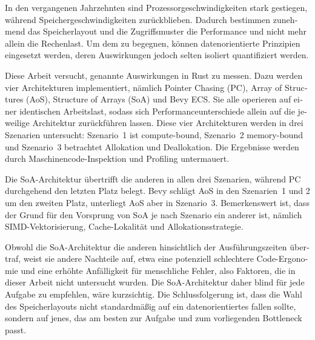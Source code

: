 \cleardoubleoddpage
\begin{otherlanguage}{ngerman}
\begin{abstract*}

In den vergangenen Jahrzehnten sind Prozessorgeschwindigkeiten stark gestiegen, während Speichergeschwindigkeiten zurückblieben. Dadurch bestimmen zunehmend das Speicherlayout und die Zugriffsmuster die Performance und nicht mehr allein die Rechenlast. Um dem zu begegnen, können datenorientierte Prinzipien eingesetzt werden, deren Auswirkungen jedoch selten isoliert quantifiziert werden. 

Diese Arbeit versucht, genannte Auswirkungen in Rust zu messen. Dazu werden vier Architekturen implementiert, nämlich Pointer Chasing (PC), Array of Structures (AoS), Structure of Arrays (SoA) und Bevy ECS. Sie alle operieren auf einer identischen Arbeitslast, sodass sich Performanceunterschiede allein auf die jeweilige Architektur zurückführen lassen. Diese vier Architekturen werden in drei Szenarien untersucht: Szenario~1 ist compute-bound, Szenario~2 memory-bound und Szenario~3 betrachtet Allokation und Deallokation. Die Ergebnisse werden durch Maschinencode-Inspektion und Profiling untermauert. 

Die SoA-Architektur übertrifft die anderen in allen drei Szenarien, während PC durchgehend den letzten Platz belegt. Bevy schlägt AoS in den Szenarien~1 und 2 um den zweiten Platz, unterliegt AoS aber in Szenario~3. Bemerkenswert ist, dass der Grund für den Vorsprung von SoA je nach Szenario ein anderer ist, nämlich SIMD-Vektorisierung, Cache-Lokalität und Allokationsstrategie. 

Obwohl die SoA-Architektur die anderen hinsichtlich der Ausführungszeiten übertraf, weist sie andere Nachteile auf, etwa eine potenziell schlechtere Code-Ergonomie und eine erhöhte Anfälligkeit für menschliche Fehler, also Faktoren, die in dieser Arbeit nicht untersucht wurden. Die SoA-Architektur daher blind für jede Aufgabe zu empfehlen, wäre kurzsichtig. Die Schlussfolgerung ist, dass die Wahl des Speicherlayouts nicht standardmäßig auf ein datenorientiertes fallen sollte, sondern auf jenes, das am besten zur Aufgabe und zum vorliegenden Bottleneck passt.

\end{abstract*}
\end{otherlanguage}


\acresetall